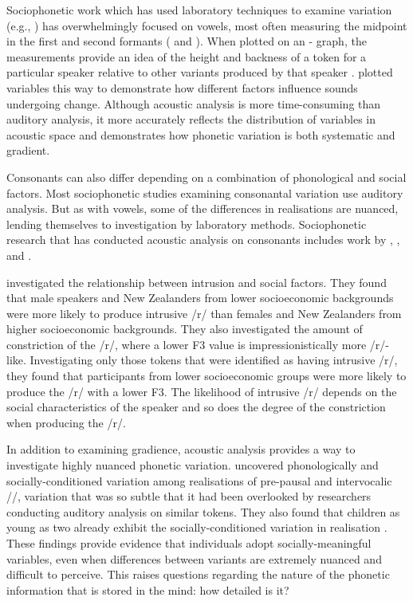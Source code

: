 Sociophonetic work which has used laboratory techniques to examine variation (e.g., \citealt{labov2001,labov2005}) has overwhelmingly focused on vowels, most often measuring the midpoint in the first and second formants ( and ). When plotted on an - graph, the measurements provide an idea of the height and backness of a token for a particular speaker relative to other variants produced by that speaker \citep[182-184]{petersonbarney1952}. \citet[466-497]{labov2001} plotted variables this way to demonstrate how different factors influence sounds undergoing change. Although acoustic analysis is more time-consuming than auditory analysis, it more accurately reflects the distribution of variables in acoustic space and demonstrates how phonetic variation is both systematic and gradient.  

Consonants can also differ depending on a combination of phonological and social factors. Most sociophonetic studies examining consonantal variation use auditory analysis. But as with vowels, some of the differences in realisations are nuanced, lending themselves to investigation by laboratory methods. Sociophonetic research that has conducted acoustic analysis on consonants includes work by \citet{haymaclagan2010}, \citet{dochertyfoulkes1999}, and \citet{foulkesdochertywatt2005}.

\citet{haymaclagan2010} investigated the relationship between  intrusion and social factors. They found that male speakers and New Zealanders from lower socioeconomic backgrounds were more likely to produce intrusive /r/ than females and New Zealanders from higher socioeconomic backgrounds. They also investigated the amount of constriction of the /r/, where a lower F3 value is impressionistically more /r/-like. Investigating only those tokens that were identified as having intrusive /r/, they found that participants from lower socioeconomic groups were more likely to produce the /r/ with a lower F3. The likelihood of intrusive /r/ depends on the social characteristics of the speaker and so does the degree of the constriction when producing the /r/. 

In addition to examining gradience, acoustic analysis provides a way to investigate highly nuanced phonetic variation. \citet{dochertyfoulkes1999} uncovered phonologically and so\-cially-condi\-tioned variation among realisations of pre-pausal and intervocalic //, variation that was so subtle that it had been overlooked by researchers conducting auditory analysis on similar tokens. They also found that children as young as two already exhibit the socially-conditioned variation in  realisation \citep{foulkesdochertywatt2005}. These findings provide evidence that individuals adopt socially-meaningful variables, even when differences between variants are extremely nuanced and difficult to perceive. This raises questions regarding the nature of the phonetic information that is stored in the mind: how detailed is it?

